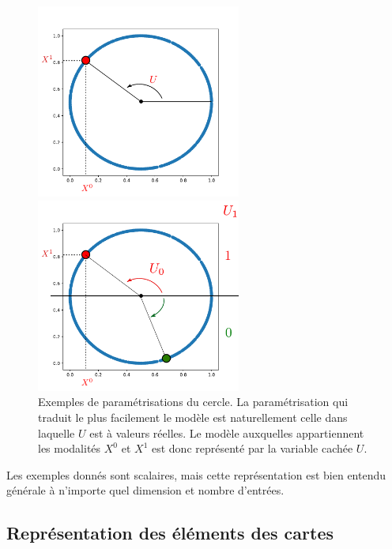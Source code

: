 \begin{figure}
\begin{minipage}{0.5\textwidth}
\centering
\includegraphics[width=0.6\textwidth]{cercle.pdf}
\end{minipage}
\begin{minipage}{0.5\textwidth}
\centering
\includegraphics[width=0.6\textwidth]{cercle_2.pdf}
\end{minipage}
\caption{Exemples de paramétrisations du cercle. La paramétrisation qui traduit le plus facilement le modèle est naturellement celle dans laquelle $U$ est à valeurs réelles. Le modèle auxquelles appartiennent les modalités $X^0$ et $X^1$ est donc représenté par la variable cachée $U$.}
\end{figure}

Les exemples donnés sont scalaires, mais cette représentation est bien entendu générale à n'importe quel dimension et nombre d'entrées.



\subsection{Représentation des éléments des cartes}

